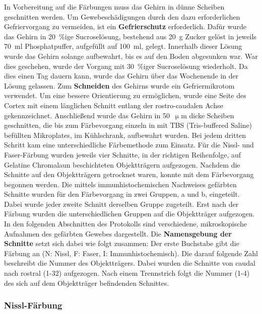 \documentclass[12pt,a4paper,pdftex]{article}
\begin{document}
In Vorbereitung auf die Färbungen muss das Gehirn in dünne Scheiben geschnitten werden. Um Gewebeschädigungen durch den dazu erforderlichen Gefriervorgang zu vermeiden, ist ein \textbf{Gefrierschutz} erforderlich. Dafür wurde das Gehirn in 20~\%ige Sucroselösung, bestehend aus 20~g Zucker gelöst in jeweils 70~ml Phosphatpuffer, aufgefüllt auf 100~ml, gelegt. Innerhalb dieser Lösung wurde das Gehirn solange aufbewahrt, bis es auf den Boden abgesunken war. War dies geschehen, wurde der Vorgang mit 30~\%iger Sucroselösung wiederholt. Da dies einen Tag dauern kann, wurde das Gehirn über das Wochenende in der Lösung gelassen. Zum \textbf{Schneiden} des Gehirns wurde ein Gefriermikrotom verwendet. Um eine bessere Orientierung zu ermöglichen, wurde eine Seite des Cortex mit einem länglichen Schnitt entlang der rostro-caudalen Achse gekennzeichnet. Anschließend wurde das Gehirn in 50~$\upmu$m dicke Scheiben geschnitten, die bis zum Färbevorgang einzeln in mit TBS (Tris-buffered Saline) befüllten Mikroplates, im Kühlschrank, aufbewahrt wurden. Bei jedem dritten Schritt kam eine unterschiedliche Färbemethode zum Einsatz. Für die Nissl- und Faser-Färbung wurden jeweils vier Schnitte, in der richtigen Reihenfolge, auf Gelatine Chromalaun beschichteten Objektträgern aufgezogen. Nachdem die Schnitte auf den Objektträgern getrocknet waren, konnte mit dem Färbevorgang begonnen werden. Die mittels immunhistochemischen Nachweises gefärbten Schnitte wurden für den Färbevorgang in zwei Gruppen, a und b, eingeteilt. Dabei wurde jeder zweite Schnitt derselben Gruppe zugeteilt. Erst nach der Färbung wurden die unterschiedlichen Gruppen auf die Objektträger aufgezogen. In den folgenden Abschnitten des Protokolls sind verschiedene, mikroskopische Aufnahmen des gefärbten Gewebes dargestellt. Die \textbf{Namensgebung der Schnitte} setzt sich dabei wie folgt zusammen: Der erste Buchstabe gibt die Färbung an (N: Nissl, F: Faser, I: Immunhistochemisch). Die darauf folgende Zahl beschreibt die Nummer des Objektträgers. Dabei wurden die Schnitte von caudal nach rostral (1-32) aufgezogen. Nach einem Trennstrich folgt die Nummer (1-4) des sich auf dem Objektträger befindenden Schnittes.

\subsubsection{Nissl-Färbung}
\end{document}
